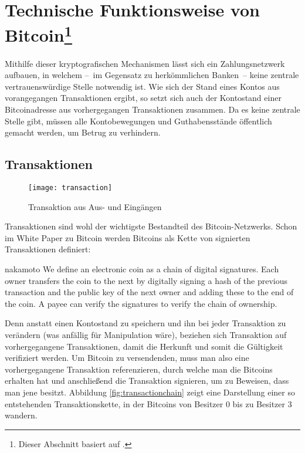 \section[Technische Funktionsweise von Bitcoin]{Technische Funktionsweise von Bitcoin\footnote{Dieser Abschnitt basiert auf \cite{nielsen}.}}
\label{sec:mechanics}

Mithilfe dieser kryptografischen Mechanismen lässt sich ein Zahlungsnetzwerk aufbauen, in welchem --~im Gegensatz zu herkömmlichen Banken~-- keine zentrale vertrauenswürdige Stelle notwendig ist.
Wie sich der Stand eines Kontos aus vorangegangen Transaktionen ergibt, so setzt sich auch der Kontostand einer Bitcoinadresse aus vorhergegangen Transaktionen zusammen.
Da es keine zentrale Stelle gibt, müssen alle Kontobewegungen und Guthabensstände öffentlich gemacht werden, um Betrug zu verhindern.

\subsection{Transaktionen}

\begin{figure}
    \begin{center}
		\texttt{[image: transaction]}
    	\caption{Transaktion aus Aus- und Eingängen \parencite[5]{nakamoto}}
    	\label{fig:transaction}
    \end{center}
\end{figure}

Transaktionen sind wohl der wichtigste Bestandteil des Bitcoin-Netzwerks.
Schon im White Paper zu Bitcoin werden Bitcoins als Kette von signierten Transaktionen definiert:

\begin{longquote}[2]{nakamoto}
We define an electronic coin as a chain of digital signatures. Each owner transfers the coin to the next by digitally signing a hash of the previous transaction and the public key of the next owner and adding these to the end of the coin. A payee can verify the signatures to verify the chain of ownership.
\end{longquote}

Denn anstatt einen Kontostand zu speichern und ihn bei jeder Transaktion zu verändern (was anfällig für Manipulation wäre), beziehen sich Transaktion auf vorhergegangene Transaktionen, damit die Herkunft und somit die Gültigkeit verifiziert werden.
Um Bitcoin zu versendenden, muss man also eine vorhergegangene Transaktion referenzieren, durch welche man die Bitcoins erhalten hat und anschließend die Transaktion signieren, um zu Beweisen, dass man jene besitzt.
Abbildung \ref{fig:transactionchain} zeigt eine Darstellung einer so entstehenden Transaktionskette, in der Bitcoins von Besitzer 0 bis zu Besitzer 3 wandern.

